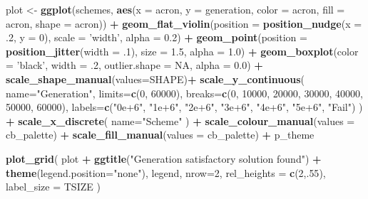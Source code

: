 \documentclass[]{book}
\newenvironment{Shaded}{\begin{snugshade}}{\end{snugshade}}
\newcommand{\DataTypeTok}[1]{\textcolor[rgb]{0.13,0.29,0.53}{#1}}
\newcommand{\DecValTok}[1]{\textcolor[rgb]{0.00,0.00,0.81}{#1}}
\newcommand{\FloatTok}[1]{\textcolor[rgb]{0.00,0.00,0.81}{#1}}
\newcommand{\KeywordTok}[1]{\textcolor[rgb]{0.13,0.29,0.53}{\textbf{#1}}}
\newcommand{\NormalTok}[1]{#1}
\newcommand{\OperatorTok}[1]{\textcolor[rgb]{0.81,0.36,0.00}{\textbf{#1}}}
\newcommand{\OtherTok}[1]{\textcolor[rgb]{0.56,0.35,0.01}{#1}}
\newcommand{\StringTok}[1]{\textcolor[rgb]{0.31,0.60,0.02}{#1}}
\begin{document}
\begin{Shaded}
\begin{Highlighting}[]
\NormalTok{plot <-}\StringTok{ }\KeywordTok{ggplot}\NormalTok{(schemes, }\KeywordTok{aes}\NormalTok{(}\DataTypeTok{x =}\NormalTok{ acron, }\DataTypeTok{y =}\NormalTok{ generation, }\DataTypeTok{color =}\NormalTok{ acron, }\DataTypeTok{fill =}\NormalTok{ acron, }\DataTypeTok{shape =}\NormalTok{ acron)) }\OperatorTok{+}
\StringTok{  }\KeywordTok{geom_flat_violin}\NormalTok{(}\DataTypeTok{position =} \KeywordTok{position_nudge}\NormalTok{(}\DataTypeTok{x =} \FloatTok{.2}\NormalTok{, }\DataTypeTok{y =} \DecValTok{0}\NormalTok{), }\DataTypeTok{scale =} \StringTok{'width'}\NormalTok{, }\DataTypeTok{alpha =} \FloatTok{0.2}\NormalTok{) }\OperatorTok{+}
\StringTok{  }\KeywordTok{geom_point}\NormalTok{(}\DataTypeTok{position =} \KeywordTok{position_jitter}\NormalTok{(}\DataTypeTok{width =} \FloatTok{.1}\NormalTok{), }\DataTypeTok{size =} \FloatTok{1.5}\NormalTok{, }\DataTypeTok{alpha =} \FloatTok{1.0}\NormalTok{) }\OperatorTok{+}
\StringTok{  }\KeywordTok{geom_boxplot}\NormalTok{(}\DataTypeTok{color =} \StringTok{'black'}\NormalTok{, }\DataTypeTok{width =} \FloatTok{.2}\NormalTok{, }\DataTypeTok{outlier.shape =} \OtherTok{NA}\NormalTok{, }\DataTypeTok{alpha =} \FloatTok{0.0}\NormalTok{) }\OperatorTok{+}
\StringTok{  }\KeywordTok{scale_shape_manual}\NormalTok{(}\DataTypeTok{values=}\NormalTok{SHAPE)}\OperatorTok{+}
\StringTok{  }\KeywordTok{scale_y_continuous}\NormalTok{(}
    \DataTypeTok{name=}\StringTok{"Generation"}\NormalTok{,}
    \DataTypeTok{limits=}\KeywordTok{c}\NormalTok{(}\DecValTok{0}\NormalTok{, }\DecValTok{60000}\NormalTok{),}
    \DataTypeTok{breaks=}\KeywordTok{c}\NormalTok{(}\DecValTok{0}\NormalTok{, }\DecValTok{10000}\NormalTok{, }\DecValTok{20000}\NormalTok{, }\DecValTok{30000}\NormalTok{, }\DecValTok{40000}\NormalTok{, }\DecValTok{50000}\NormalTok{, }\DecValTok{60000}\NormalTok{),}
    \DataTypeTok{labels=}\KeywordTok{c}\NormalTok{(}\StringTok{"0e+6"}\NormalTok{, }\StringTok{"1e+6"}\NormalTok{, }\StringTok{"2e+6"}\NormalTok{, }\StringTok{"3e+6"}\NormalTok{, }\StringTok{"4e+6"}\NormalTok{, }\StringTok{"5e+6"}\NormalTok{, }\StringTok{"Fail"}\NormalTok{)}
\NormalTok{  ) }\OperatorTok{+}
\StringTok{  }\KeywordTok{scale_x_discrete}\NormalTok{(}
    \DataTypeTok{name=}\StringTok{"Scheme"}
\NormalTok{  ) }\OperatorTok{+}
\StringTok{  }\KeywordTok{scale_colour_manual}\NormalTok{(}\DataTypeTok{values =}\NormalTok{ cb_palette) }\OperatorTok{+}
\StringTok{  }\KeywordTok{scale_fill_manual}\NormalTok{(}\DataTypeTok{values =}\NormalTok{ cb_palette) }\OperatorTok{+}
\StringTok{  }\NormalTok{p_theme}

\KeywordTok{plot_grid}\NormalTok{(}
\NormalTok{  plot }\OperatorTok{+}
\StringTok{    }\KeywordTok{ggtitle}\NormalTok{(}\StringTok{"Generation satisfactory solution found"}\NormalTok{) }\OperatorTok{+}
\StringTok{    }\KeywordTok{theme}\NormalTok{(}\DataTypeTok{legend.position=}\StringTok{"none"}\NormalTok{),}
\NormalTok{  legend,}
  \DataTypeTok{nrow=}\DecValTok{2}\NormalTok{,}
  \DataTypeTok{rel_heights =} \KeywordTok{c}\NormalTok{(}\DecValTok{2}\NormalTok{,.}\DecValTok{55}\NormalTok{),}
  \DataTypeTok{label_size =}\NormalTok{ TSIZE}
\NormalTok{)}
\end{Highlighting}
\end{Shaded}
\end{document}
